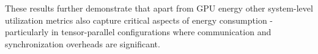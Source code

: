These results further demonstrate that apart from GPU energy other system-level utilization metrics also capture critical aspects of energy consumption - particularly in tensor-parallel configurations where communication and synchronization overheads are significant. 












